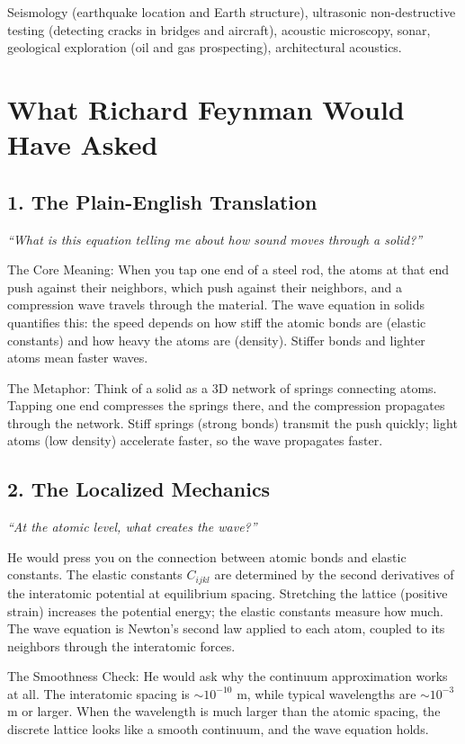 Seismology (earthquake location and Earth structure), ultrasonic non-destructive testing (detecting cracks in bridges and aircraft), acoustic microscopy, sonar, geological exploration (oil and gas prospecting), architectural acoustics.
\section*{What Richard Feynman Would Have Asked}

\subsection*{1. The Plain-English Translation}
\textit{``What is this equation telling me about how sound moves through a solid?''}

The Core Meaning: When you tap one end of a steel rod, the atoms at that end push against their neighbors, which push against their neighbors, and a compression wave travels through the material. The wave equation in solids quantifies this: the speed depends on how stiff the atomic bonds are (elastic constants) and how heavy the atoms are (density). Stiffer bonds and lighter atoms mean faster waves.

The Metaphor: Think of a solid as a 3D network of springs connecting atoms. Tapping one end compresses the springs there, and the compression propagates through the network. Stiff springs (strong bonds) transmit the push quickly; light atoms (low density) accelerate faster, so the wave propagates faster.

\subsection*{2. The Localized Mechanics}
\textit{``At the atomic level, what creates the wave?''}

He would press you on the connection between atomic bonds and elastic constants. The elastic constants $C_{ijkl}$ are determined by the second derivatives of the interatomic potential at equilibrium spacing. Stretching the lattice (positive strain) increases the potential energy; the elastic constants measure how much. The wave equation is Newton's second law applied to each atom, coupled to its neighbors through the interatomic forces.

The Smoothness Check: He would ask why the continuum approximation works at all. The interatomic spacing is $\sim 10^{-10}$ m, while typical wavelengths are $\sim 10^{-3}$ m or larger. When the wavelength is much larger than the atomic spacing, the discrete lattice looks like a smooth continuum, and the wave equation holds.

